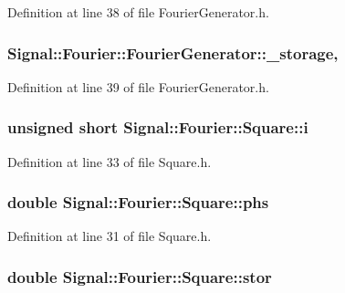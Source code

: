 Definition at line 38 of file Fourier\+Generator.\+h.

\hypertarget{classSignal_1_1Fourier_1_1FourierGenerator_ab6e6b79cf56e31c9a1b5766f357f8cfb}{
\subsubsection[{\+\_\+storage}]{ Signal\+::\+Fourier\+::\+Fourier\+Generator\+::\+\_\+storage\hspace{0.3cm}{\ttfamily [protected]}, {\ttfamily [inherited]}}}\label{classSignal_1_1Fourier_1_1FourierGenerator_ab6e6b79cf56e31c9a1b5766f357f8cfb}


Definition at line 39 of file Fourier\+Generator.\+h.

\hypertarget{classSignal_1_1Fourier_1_1Square_a942768cca477bd9bfc71f9a3ea1be8e5}{
\subsubsection[{i}]{\setlength{\rightskip}{0pt plus 5cm}unsigned short Signal\+::\+Fourier\+::\+Square\+::i\hspace{0.3cm}{\ttfamily [protected]}}}\label{classSignal_1_1Fourier_1_1Square_a942768cca477bd9bfc71f9a3ea1be8e5}


Definition at line 33 of file Square.\+h.

\hypertarget{classSignal_1_1Fourier_1_1Square_a3a18caa52584be9a6a1777804d42120e}{
\subsubsection[{phs}]{\setlength{\rightskip}{0pt plus 5cm}double Signal\+::\+Fourier\+::\+Square\+::phs\hspace{0.3cm}{\ttfamily [protected]}}}\label{classSignal_1_1Fourier_1_1Square_a3a18caa52584be9a6a1777804d42120e}


Definition at line 31 of file Square.\+h.

\hypertarget{classSignal_1_1Fourier_1_1Square_a47ec083d36cef49c7d6583c8741b7905}{
\subsubsection[{stor}]{\setlength{\rightskip}{0pt plus 5cm}double Signal\+::\+Fourier\+::\+Square\+::stor\hspace{0.3cm}{\ttfamily [protected]}}}\label{classSignal_1_1Fourier_1_1Square_a47ec083d36cef49c7d6583c8741b7905}


